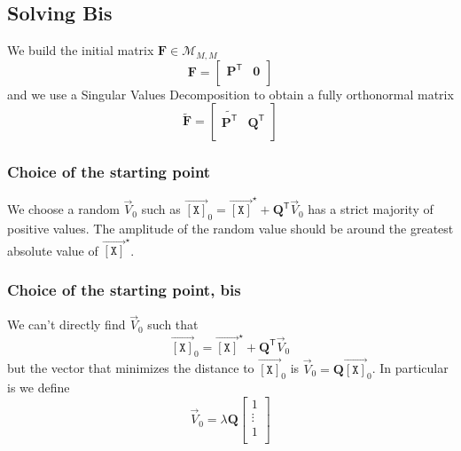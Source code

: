 \documentclass[aps,twocolumn]{revtex4}
\newcommand{\myconc}[1]{\left\lbrack #1 \right\rbrack}
\newcommand{\mychem}[1]{{\mathtt{#1}}}
\newcommand{\mymat}[1]{\boldsymbol{#1}}
\newcommand{\mytrn}[1]{{#1}^{\mathsf{T}}}
\newcommand{\myvec}[1]{\overrightarrow{#1}}
\newcommand{\vecX}{\myvec{\myconc{\mychem{X}}}}
\begin{document}
\subsection{Solving Bis}
We build the initial matrix $\mymat{F}\in\mathcal{M}_{M,M}$
\begin{equation}
	\mymat{F} = 
	\left\lbrack
	\begin{array}{cc}
	\mytrn{\mymat{P}} & \mymat{0} \\
	\end{array}
	\right\rbrack
\end{equation}
and we use a Singular Values Decomposition to obtain a fully
orthonormal matrix
\begin{equation}
	\tilde{\mymat{F}} = 
	\left\lbrack
	\begin{array}{cc}
	\tilde{\mytrn{\mymat{P}}} & \mytrn{\mymat{Q}} \\
	\end{array}
	\right\rbrack
\end{equation}

\subsubsection{Choice of the starting point}
We choose a random $\vec{V}_0$ such as $\vecX_0 = \vecX^\star +  \mytrn{\mymat{Q}}\vec{V}_0$ has a strict majority of
positive values.
The amplitude of the random value
should be around the greatest absolute value of $\vecX^\star$.

\subsubsection{Choice of the starting point, bis}
We can't directly find $\vec{V}_0$ such that
\[
	\vecX_0 = \vecX^\star + \mytrn{\mymat{Q}}\vec{V}_0
\]	
but the vector that minimizes the distance to $\vecX_0$ is $\vec{V}_0=\mymat{Q}\vecX_0$.
In particular is we define
\[
	\vec{V}_0 = \lambda \mymat{Q}
	\left\lbrack
	\begin{array}{c}
	1\\
	\vdots\\
	1\\
	\end{array}
	\right\rbrack
\]
\end{document}
